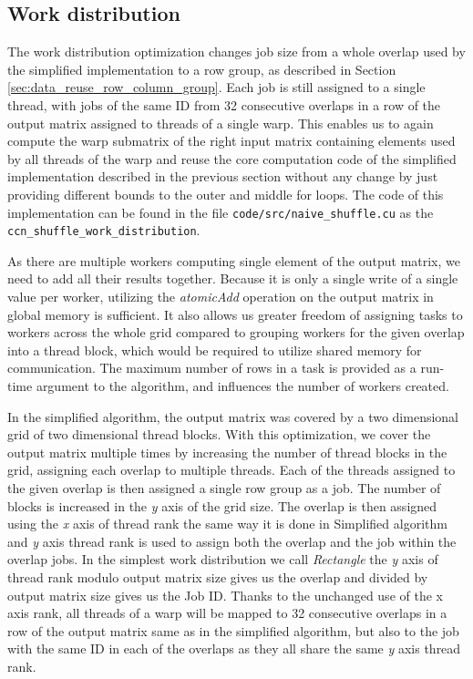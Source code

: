 \subsection{Work distribution}
\label{sec:warp_shuffle_work_dist}

The work distribution optimization changes job size from a whole overlap used by the simplified implementation to a row group, as described in Section \ref{sec:data_reuse_row_column_group}. Each job is still assigned to a single thread, with jobs of the same ID from 32 consecutive overlaps in a row of the output matrix assigned to threads of a single warp. This enables us to again compute the warp submatrix of the right input matrix containing elements used by all threads of the warp and reuse the core computation code of the simplified implementation described in the previous section without any change by just providing different bounds to the outer and middle for loops. The code of this implementation can be found in the file \texttt{code/src/naive\_shuffle.cu} as the \texttt{ccn\_shuffle\_work\_distribution}.


As there are multiple workers computing single element of the output matrix, we need to add all their results together. Because it is only a single write of a single value per worker, utilizing the \textit{atomicAdd} \citep{site:cuda_reduction} operation on the output matrix in global memory is sufficient. It also allows us greater freedom of assigning tasks to workers across the whole grid compared to grouping workers for the given overlap into a thread block, which would be required to utilize shared memory for communication. The maximum number of rows in a task is provided as a run-time argument to the algorithm, and influences the number of workers created.


In the simplified algorithm, the output matrix was covered by a two dimensional grid of two dimensional thread blocks. With this optimization, we cover the output matrix multiple times by increasing the number of thread blocks in the grid, assigning each overlap to multiple threads. Each of the threads assigned to the given overlap is then assigned a single row group as a job. The number of blocks is increased in the \textit{y} axis of the grid size. The overlap is then assigned using the \textit{x} axis of thread rank the same way it is done in Simplified algorithm and \textit{y} axis thread rank  is used to assign both the overlap and the job within the overlap jobs. 
In the simplest work distribution we call \textit{Rectangle} the \textit{y} axis of thread rank modulo output matrix size gives us the overlap and divided by output matrix size gives us the Job ID. Thanks to the unchanged use of the x axis rank, all threads of a warp will be mapped to 32 consecutive overlaps in a row of the output matrix same as in the simplified algorithm, but also to the job with the same ID in each of the overlaps as they all share the same \textit{y} axis thread rank.

